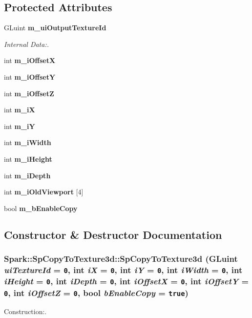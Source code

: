 \subsection*{Protected Attributes}
\begin{CompactItemize}
\item 
GLuint {\bf m\_\-ui\-Output\-Texture\-Id}
\begin{CompactList}\small\item\em Internal Data:. \item\end{CompactList}\item 
int {\bf m\_\-i\-Offset\-X}
\item 
int {\bf m\_\-i\-Offset\-Y}
\item 
int {\bf m\_\-i\-Offset\-Z}
\item 
int {\bf m\_\-i\-X}
\item 
int {\bf m\_\-i\-Y}
\item 
int {\bf m\_\-i\-Width}
\item 
int {\bf m\_\-i\-Height}
\item 
int {\bf m\_\-i\-Depth}
\item 
int {\bf m\_\-i\-Old\-Viewport} [4]
\item 
bool {\bf m\_\-b\-Enable\-Copy}
\end{CompactItemize}


\subsection{Constructor \& Destructor Documentation}
\subsubsection{\setlength{\rightskip}{0pt plus 5cm}Spark::Sp\-Copy\-To\-Texture3d::Sp\-Copy\-To\-Texture3d (GLuint {\em ui\-Texture\-Id} = {\tt 0}, int {\em i\-X} = {\tt 0}, int {\em i\-Y} = {\tt 0}, int {\em i\-Width} = {\tt 0}, int {\em i\-Height} = {\tt 0}, int {\em i\-Depth} = {\tt 0}, int {\em i\-Offset\-X} = {\tt 0}, int {\em i\-Offset\-Y} = {\tt 0}, int {\em i\-Offset\-Z} = {\tt 0}, bool {\em b\-Enable\-Copy} = {\tt true})\hspace{0.3cm}{\tt  [inline]}}\label{classSpark_1_1SpCopyToTexture3d_a0}


Construction:. 

